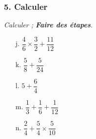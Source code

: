 \newpage
\subsubsection*{5. Calculer}
\textit{Calculer ; \textbf{Faire des étapes}.}

\begin{multicols}{5}
\begin{enumerate}
  \item[j.] $\dfrac{4}{6} \times \dfrac{3}{2} + \dfrac{11}{12}$
  \item[k.] $\dfrac{5}{8} + \dfrac{5}{24}$
  \item[l.] $5 + \dfrac{6}{4}$
  \item[m.] $\dfrac{1}{3} + \dfrac{1}{6} + \dfrac{1}{12}$
  \item[n.] $\dfrac{2}{4} + \dfrac{5}{4} \times \dfrac{5}{10}$
\end{enumerate}
\end{multicols}

\Pointilles[48]
